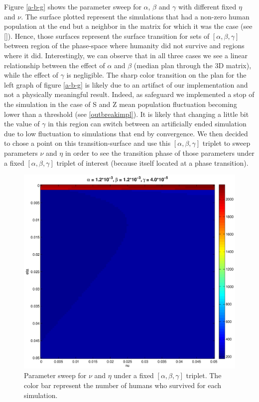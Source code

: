 \documentclass[11pt]{article} %
\begin{document}
Figure \ref{a-b-g} shows the parameter sweep for $\alpha$, $\beta$ and $\gamma$ with different fixed $\eta$ and $\nu$. The surface plotted represent the simulations that had a non-zero human population at the end but a neighbor in the matrix for which it was the case (see \ref{}). Hence, those surfaces represent the surface transition for sets of $[\alpha, \beta, \gamma]$ between region of the phase-space where humanity did not survive and regions where it did. Interestingly, we can observe that in all three cases we see a linear relationship between the effect of $\alpha$ and $\beta$ (median plan through the 3D matrix), while the effect of $\gamma$ is negligible. The sharp color transition on the plan for the left graph of figure \ref{a-b-g} is likely due to an artifact of our implementation and not a physically meaningful result. Indeed, as safeguard we implemented a stop of the simulation in the case of S and Z mean population fluctuation becoming lower than a threshold (see \ref{outbreakimpl}). It is likely that changing a little bit the value of $\gamma$ in this region can switch between an artificially ended simulation due to low fluctuation to simulations that end by convergence. We then decided to chose a point on this transition-surface and use this $[\alpha, \beta, \gamma]$ triplet to sweep parameters $\nu$ and $\eta$ in order to see the transition phase of those parameters under a fixed $[\alpha, \beta, \gamma]$ triplet of interest (because itself located at a phase transition).
\begin{figure}[h!]
\centerline{
\includegraphics[scale=0.33]{../images/Matlab_figures/nu-eta-sweep.eps}}
\caption{Parameter sweep for $\nu$ and $\eta$ under a fixed  $[\alpha, \beta, \gamma]$ triplet. The color bar represent the number of humans who survived for each simulation.  \label{nueta} }
\end{figure}
\end{document}

